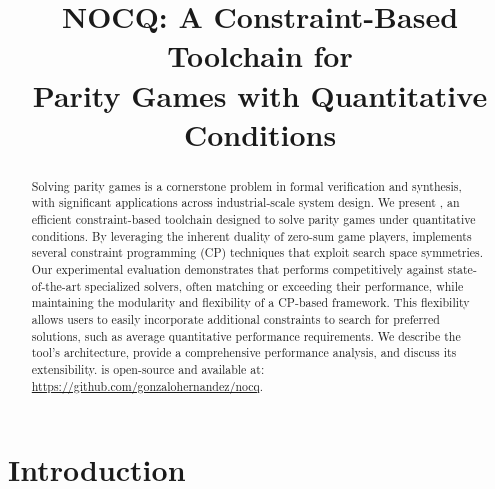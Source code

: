 \documentclass[a4paper,UKenglish,cleveref, autoref, thm-restate, anonymous]{lipics-v2021}
\title{NOCQ: A Constraint-Based Toolchain for\\Parity Games with Quantitative Conditions} %
\begin{document}
\maketitle

\begin{abstract}
Solving parity games is a cornerstone problem in formal verification and synthesis, with significant applications across industrial-scale system design. We present \nocq, an efficient constraint-based toolchain designed to solve parity games under quantitative conditions. By leveraging the inherent duality of zero-sum game players, \nocq implements several constraint programming (CP) techniques that exploit search space symmetries. Our experimental evaluation demonstrates that \nocq performs competitively against state-of-the-art specialized solvers, often matching or exceeding their performance, while maintaining the modularity and flexibility of a CP-based framework. This flexibility allows users to easily incorporate additional constraints to search for preferred solutions, such as average quantitative performance requirements. We describe the tool's architecture, provide a comprehensive performance analysis, and discuss its extensibility. \nocq is open-source and available at: \url{https://github.com/gonzalohernandez/nocq}.

\end{abstract}

\section{Introduction}

\end{document}
